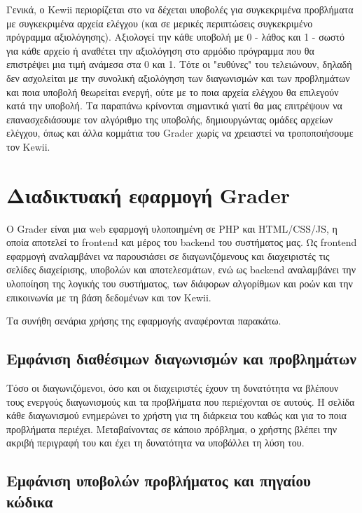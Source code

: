 \documentclass[diploma]{softlab-thesis}
\begin{document}
Γενικά, ο Kewii περιορίζεται στο να δέχεται υποβολές για συγκεκριμένα προβλήματα
με συγκεκριμένα αρχεία ελέγχου (και σε μερικές περιπτώσεις συγκεκριμένο πρόγραμμα
αξιολόγησης). Αξιολογεί την κάθε υποβολή με 0 - λάθος και 1 - σωστό για κάθε αρχείο
ή αναθέτει την αξιολόγηση στο αρμόδιο πρόγραμμα που θα επιστρέψει μια τιμή ανάμεσα
στα 0 και 1. Τότε οι "ευθύνες" του τελειώνουν, δηλαδή δεν ασχολείται με την συνολική
αξιολόγηση των διαγωνισμών και των προβλημάτων και ποια υποβολή θεωρείται ενεργή,
ούτε με το ποια αρχεία ελέγχου θα επιλεγούν κατά την υποβολή. Τα παραπάνω κρίνονται
σημαντικά γιατί θα μας επιτρέψουν να επανασχεδιάσουμε τον αλγόριθμο της υποβολής,
δημιουργώντας ομάδες αρχείων ελέγχου, όπως και άλλα κομμάτια του Grader χωρίς να
χρειαστεί να τροποποιήσουμε τον Kewii.

\section{Διαδικτυακή εφαρμογή Grader}

Ο Grader είναι μια web εφαρμογή υλοποιημένη σε PHP και HTML/CSS/JS, η οποία αποτελεί
το frontend και μέρος του backend του συστήματος μας. Ως frontend εφαρμογή
αναλαμβάνει να παρουσιάσει σε διαγωνιζόμενους και διαχειριστές τις σελίδες
διαχείρισης, υποβολών και αποτελεσμάτων, ενώ ως backend αναλαμβάνει την υλοποίηση της
λογικής του συστήματος, των διάφορων αλγορίθμων και ροών και την επικοινωνία με τη
βάση δεδομένων και τον Kewii.

\bigskip

\noindent Τα συνήθη σενάρια χρήσης της εφαρμογής αναφέρονται παρακάτω.

\subsection{Εμφάνιση διαθέσιμων διαγωνισμών και προβλημάτων}

Τόσο οι διαγωνιζόμενοι, όσο και οι διαχειριστές έχουν τη δυνατότητα να βλέπουν
τους ενεργούς διαγωνισμούς και τα προβλήματα που περιέχονται σε αυτούς. Η
σελίδα κάθε διαγωνισμού ενημερώνει το χρήστη για τη διάρκεια του καθώς και για
το ποια προβλήματα περιέχει. Μεταβαίνοντας σε κάποιο πρόβλημα, ο χρήστης βλέπει
την ακριβή περιγραφή του και έχει τη δυνατότητα να υποβάλλει τη λύση του.

\subsection{Εμφάνιση υποβολών προβλήματος και πηγαίου κώδικα}
\end{document}

